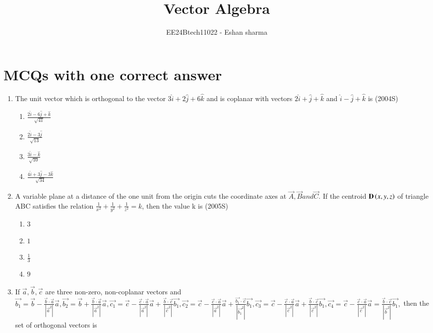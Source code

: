 \documentclass[journal,12pt,twocolumn]{IEEEtran}
\theoremstyle{remark}
\begin{document}

\vspace{3cm}

\title{Vector Algebra}
\author{EE24Btech11022 - Eshan sharma}
\maketitle
\newpage
\bigskip

\renewcommand{\thefigure}{\theenumi}
\renewcommand{\thetable}{\theenumi}


\section{MCQs with one correct answer}
\begin{enumerate}
    \item The unit vector which is orthogonal to the vector $3\hat{i} + 2\hat{j} + 6\hat{k}$ and is coplanar with vectors $2\hat{i} + \hat{j} + \hat{k}$ and $\hat{i} - \hat{j} + \hat{k}$ is 
    \hfill{(2004S)}
    \begin{multicols}{2}
    \begin{enumerate}
    \item $\frac{2\hat{i} - 6\hat{j} + \hat{k}}{\sqrt{41}}$
    \item $\frac{2\hat{i} - 3\hat{j}}{\sqrt{13}}$
    \item $\frac{3\hat{i} - \hat{k}}{\sqrt{10}}$
    \item $\frac{4\hat{i} + 3\hat{j} - 3\hat{k}}{\sqrt{34}}$
    \end{enumerate}
    \end{multicols}
    \item A variable plane at a distance of the one unit from the origin cuts the coordinate axes at $\vec{A},\vec{B} and \vec{C}$. If the centroid $\mathbf{D} \left(x,y,z\right)$ of triangle ABC satisfies the relation $\frac{1}{x^{2}} + \frac{1}{y^{2}} + \frac{1}{z^{2}} = k$, then the value k is
    \hfill{(2005S)}
    \begin{multicols}{2}
    \begin{enumerate}
    \item $3$
    \item $1$
    \item $\frac{1}{3}$
    \item $9$
    \end{enumerate}
    \end{multicols}
    \item If $\vec{a} ,\vec{b} ,\vec{c}$ are three non-zero, non-coplanar vectors and $\vec{b_1} = \vec{b} - \frac{\vec{b} \cdot \vec{a}}{|\vec{a}^2|} \vec{a} , \vec{b_2} = \vec{b} + \frac{\vec{b} \cdot \vec{a}}{|\vec{a}^2|} \vec{a}, \vec{c_1} = \vec{c} - \frac{\vec{c} \cdot \vec{a}}{|\vec{a}^2|} \vec{a} + \frac{\vec{b} \cdot \vec{c}}{|\vec{c}^2|} \vec{b_1}, \vec{c_2} = \vec{c} - \frac{\vec{c} \cdot \vec{a}}{|\vec{a}^2|} \vec{a} + \frac{\vec{b_1} \cdot \vec{c}}{|\vec{b_1}^2|} \vec{b_1}, \vec{c_3} = \vec{c} - \frac{\vec{c} \cdot \vec{a}}{|\vec{c}^2|} \vec{a} + \frac{\vec{b} \cdot \vec{c}}{|\vec{c}^2|} \vec{b_1}, \vec{c_4} = \vec{c} - \frac{\vec{c} \cdot \vec{a}}{|\vec{c}^2|} \vec{a} = \frac{\vec{b} \cdot \vec{c}}{|\vec{b}^2|} \vec{b_1},$ then the set of orthogonal vectors is 

\end{enumerate}
\end{document}

